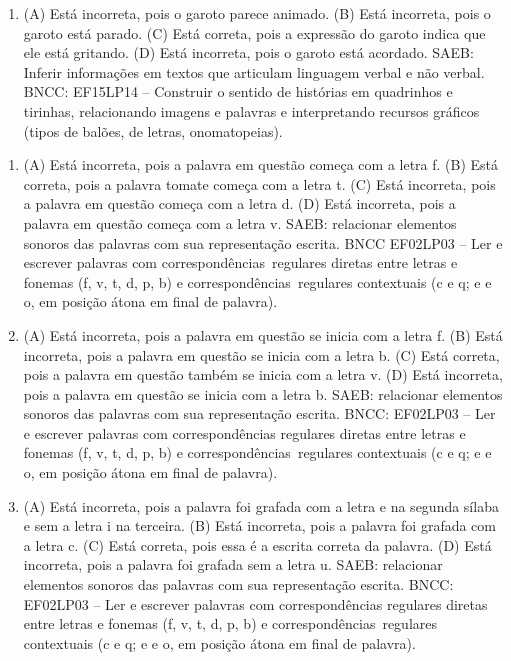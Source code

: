 \begin{enumerate}
\item
(A) Está incorreta, pois o garoto parece animado.
(B) Está incorreta, pois o garoto está parado.
(C) Está correta, pois a expressão do garoto indica que ele está gritando.
(D) Está incorreta, pois o garoto está acordado.
SAEB: Inferir informações em textos que articulam linguagem verbal e não verbal.
BNCC: EF15LP14 -- Construir o sentido de histórias em quadrinhos
e tirinhas, relacionando imagens e palavras e interpretando recursos
gráficos (tipos de balões, de letras, onomatopeias).
\end{enumerate}


\begin{enumerate}
\item
(A) Está incorreta, pois a palavra em questão começa com a letra f.
(B) Está correta, pois a palavra tomate começa com a letra t.
(C) Está incorreta, pois a palavra em questão começa com a letra d.
(D) Está incorreta, pois a palavra em questão começa com a letra v.
SAEB: relacionar elementos sonoros das palavras com sua representação escrita.
BNCC EF02LP03 -- Ler e escrever palavras com correspondências~regulares
diretas entre letras e fonemas (f, v, t, d, p, b) e correspondências~regulares contextuais (c e q; e e o, em posição átona em final de palavra).

\item
(A) Está incorreta, pois a palavra em questão se inicia com a letra f.
(B) Está incorreta, pois a palavra em questão se inicia com a letra b.
(C) Está correta, pois a palavra em questão também se inicia com a letra v.
(D) Está incorreta, pois a palavra em questão se inicia com a letra b.
SAEB: relacionar elementos sonoros das palavras com sua representação escrita.
BNCC: EF02LP03 -- Ler e escrever palavras com correspondências
regulares diretas entre letras e fonemas (f, v, t, d, p, b) e
correspondências~regulares contextuais (c e q; e e o, em posição átona
em final de palavra).

\item
(A) Está incorreta, pois a palavra foi grafada com a letra e na segunda sílaba e sem a letra i na terceira.
(B) Está incorreta, pois a palavra foi grafada com a letra c.
(C) Está correta, pois essa é a escrita correta da palavra.
(D) Está incorreta, pois a palavra foi grafada sem a letra u.
SAEB: relacionar elementos sonoros das palavras com sua representação escrita.
BNCC: EF02LP03 -- Ler e escrever palavras com correspondências
regulares diretas entre letras e fonemas (f, v, t, d, p, b) e
correspondências~regulares contextuais (c e q; e e o, em posição átona
em final de palavra).


\end{enumerate}
